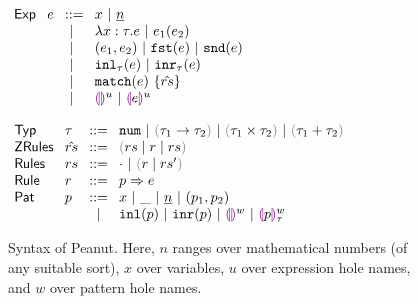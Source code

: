 
\begin{figure}[t]
    \centering
    \begin{minipage}{.44\linewidth}
  $\arraycolsep=4pt\begin{array}{lcll}
    \mathsf{Exp} & e & ::= &
      x ~\vert~
      \hnum{n} \\&
      & ~\vert~ &
      \hlam{x}{\tau}{e} ~\vert~
      \hap{e_1}{e_2} \\&
      & ~\vert~ &
      \hpair{e_1}{e_2} ~\vert~
      \hfst{e} ~\vert~ \hsnd{e} \\&
      & ~\vert~ &
      \hinl{\tau}{e} ~\vert~
      \hinr{\tau}{e} \\&
      & ~\vert~ &
      \hmatch{e}{\hat{rs}} \\&
      & ~\vert~ &
      \hehole{u} ~\vert~
      \hhole{e}{u}
    \end{array}$
    \end{minipage}%
    \begin{minipage}{.55\linewidth}
  $\arraycolsep=4pt\begin{array}{llcl}
    \mathsf{Typ} & \tau & ::= &
      \tnum ~\vert~
      \tarr{\tau_1}{\tau_2} ~\vert~
      \tprod{\tau_1}{\tau_2} ~\vert~
      \tsum{\tau_1}{\tau_2} \\
    \mathsf{ZRules} & \hat{rs} & ::= &
      \zrulsP{rs}{r}{rs} \\
    \mathsf{Rules} & rs & ::= &
      \cdot ~\vert~ \hrulesP{r}{rs'} \\
    \mathsf{Rule} & r & ::= &
      \hrul{p}{e} \\
    \mathsf{Pat} & p & ::= &
      x ~\vert~
      \_ ~\vert~
      \hnum{n} ~\vert~
      \hpair{p_1}{p_2} \\&
      & ~\vert~ &
      \hinlp{p} ~\vert~
      \hinrp{p} ~\vert~
      \heholep{w} ~\vert~
      \hholep{p}{w}{\tau}
    \end{array}$
    \end{minipage}
\caption{Syntax of Peanut. Here, $n$ ranges over mathematical numbers (of any suitable sort), $x$ over variables, $u$ over expression hole names, and $w$ over pattern hole names.}
\label{fig:syntax}
\end{figure}